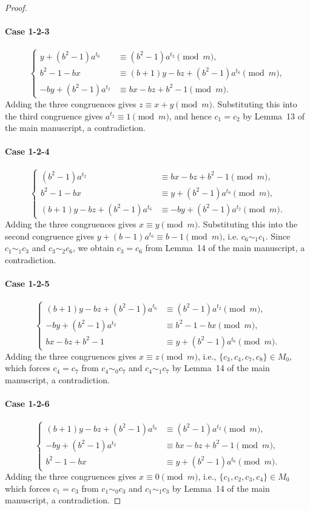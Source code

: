 \documentclass[11pt]{article}
\newcommand{\mymod}{\pmod{m}}
\begin{document}
\begin{proof}
\paragraph{Case 1-2-3}
$$
\begin{cases}
	y+(b^2-1)a^{t_6} &\equiv (b^2-1)a^{t_2}\mymod,\\
	b^2-1-bx &\equiv (b+1)y-bz+(b^2-1)a^{t_6}\mymod,\\
	-by+(b^2-1)a^{t_2} &\equiv bx-bz+b^2-1\mymod.
\end{cases}
$$
Adding the three congruences gives $z\equiv x+y\mymod$. Substituting this
into the third congruence gives $a^{t_2}\equiv1\mymod$, and hence
$c_1=c_2$ by Lemma~13 of the main manuscript, a contradiction.

\paragraph{Case 1-2-4}
$$
\begin{cases}
	(b^2-1)a^{t_2} &\equiv bx-bz+b^2-1\mymod, \\
	b^2-1-bx &\equiv y+(b^2-1)a^{t_6}\mymod,\\
    (b+1)y-bz+(b^2-1)a^{t_6}&\equiv -by+(b^2-1)a^{t_2}\mymod.
\end{cases}
$$
Adding the three congruences gives $x\equiv y\mymod$. Substituting this
into the second congruence gives $y+(b-1)a^{t_6}\equiv b-1\mymod$, i.e. $c_6\sim_1 c_1$.
Since $c_1 \sim_1 c_3$ and $c_3\sim_2 c_6$,
we obtain $c_3=c_6$ from Lemma~14 of the main manuscript, a contradiction.

\paragraph{Case 1-2-5}
$$
\begin{cases}
	 (b+1)y-bz+(b^2-1)a^{t_6}&\equiv (b^2-1)a^{t_2}\mymod, \\
	-by+(b^2-1)a^{t_2} &\equiv b^2-1-bx\mymod,\\
	bx-bz+b^2-1 &\equiv y+(b^2-1)a^{t_6}\mymod.
\end{cases}
$$
Adding the three congruences gives $x\equiv z\mymod$, i.e., $\{c_3,c_4,c_7,c_8\}\in M_0$, which forces $c_4=c_7$ from $c_4\sim_0 c_7$ and $c_4\sim_1 c_7$ by Lemma~14 of the main manuscript, a contradiction.

\paragraph{Case 1-2-6}
$$
\begin{cases}
	(b+1)y-bz+(b^2-1)a^{t_6} &\equiv (b^2-1)a^{t_2}\mymod,  \\
	-by+(b^2-1)a^{t_2} &\equiv bx-bz+b^2-1\mymod, \\
	b^2-1-bx&\equiv y+(b^2-1)a^{t_6}\mymod.
\end{cases}
$$
Adding the three congruences gives $x\equiv0\mymod$, i.e., $\{c_1,c_2,c_3,c_4\}\in M_0$ which forces
$c_1=c_3$ from $c_1\sim_0 c_3$ and $c_1\sim_1 c_3$ by Lemma~14 of the main manuscript, a contradiction.


\end{proof}
\end{document}
